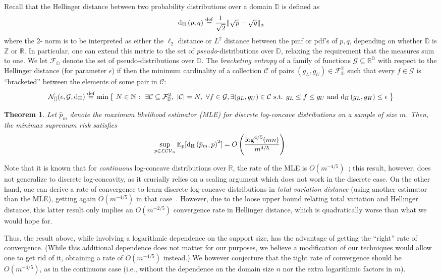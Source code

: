 \documentclass[11pt]{article}
\newcommand{\new}[1]{{\color{red} #1}}
\newcommand{\new}[1]{{#1}}
\newtheorem{theorem}{Theorem}[section]
\theoremstyle{definition}
\newcommand{\R}{\mathbb{R}}
\newcommand{\Z}{\mathbb{Z}}
\newcommand{\N}{\mathbb{N}}
\newcommand{\eps}{\epsilon}
\newcommand{\abs}[1]{\lvert#1\rvert}
\newcommand{\norm}[1]{\lVert#1\rVert}
\newcommand{\eqdef}{\stackrel{{\mathrm {\footnotesize def}}}{=}}
\newcommand{\normtwo}[1]{{\norm{#1}}_2}
\renewcommand{\abs}[1]{\left\lvert #1 \right\rvert}
\newcommand{\setOfSuchThat}[2]{ \left\{\; #1 \;\colon\; #2\; \right\} } 			\newcommand{\clg}[1]{\left\lceil #1 \right\rceil}
\newcommand{\bigO}[1]{{O\left( #1 \right)}}
\newcommand{\tildeO}[1]{\tilde{O}\left( #1 \right)}
\newcommand{\classlogconcave}{\ensuremath{\mathcal{LCV}}\xspace}
\newcommand{\bracketing}[3][\operatorname{d}_{\rm H}]{\mathcal{N}_{[ ]}(#2,#3,#1)}
\newcommand{\hellinger}[2]{{\operatorname{d_{\rm{}H}}\left({#1, #2}\right)}}
\newcommand{\lp}[1][1]{\ell_{#1}}
\newcommand{\class}{\ensuremath{\mathcal{C}}\xspace} \newenvironment{proofof}[1]{\begin{proof}[Proof of {#1}]}{\end{proof}}
\newcommand{\shortexpect}{\mathbb{E}}
\begin{document}
Recall that the Hellinger distance between two probability distributions over a domain $\mathbb{D}$ is defined as 
\[
\hellinger{p}{q} \eqdef \frac{1}{\sqrt{2}}\normtwo{\sqrt{p}-\sqrt{q}}
\]
where the 2- norm is to be interpreted as either the $\lp[2]$ distance or $L^2$ distance between the pmf or pdf's of $p,q$, depending on whether $\mathbb{D}$ is $\Z$ or $\R$. In particular, one can extend this metric to the set of \emph{pseudo}-distributions over $\mathbb{D}$, relaxing the requirement that the measures sum to one. We let $\mathcal{F}_{\mathbb{D}}$ denote the set of pseudo-distributions over $\mathbb{D}$. The \emph{bracketing entropy} of a family of functions $\mathcal{G}\subseteq\R^{\mathbb{D}}$ with respect to the Hellinger distance (for parameter $\eps$) if then the minimum cardinality of a collection $\class$ of pairs $(g_L,g_U)\in \mathcal{F}_{\mathbb{D}}^2$ such that every $f\in\mathcal{G}$ is ``bracketed'' between the elements of some pair in $\class$:
\[
    \bracketing{\eps}{\mathcal{G}} \eqdef \min\setOfSuchThat{ N\in\N }{ \exists \class \subseteq \mathcal{F}_{\mathbb{D}}^2,\ \abs{\class}=N,\ \forall f\in\mathcal{G}, \exists (g_L,g_U)\in\class\text{ s.t. } g_L\leq f\leq g_U \text{ and } \hellinger{g_L}{g_H}\leq \eps }
\]

\begin{theorem}\label{theo:mle:logconcave}
Let $\hat{p}_m$ denote the maximum likelihood estimator (MLE) for discrete log-concave distributions on a sample of size $m$. Then, the minimax supremum risk satisfies
\[
    \sup_{p\in\classlogconcave_n}\shortexpect_p[ \hellinger{\hat{p}_m}{p}^2 ] = \bigO{ \frac{\log^{4/5} (mn)}{m^{4/5}} }.
\]
\end{theorem}

Note that it is known that for \emph{continuous} log-concave distributions over $\R$, the rate of the MLE is $O(m^{-4/5})$~\cite{KS:16}; this result, however, does not generalize to discrete log-concavity, as it crucially relies on a scaling argument which does not work in the discrete case. On the other hand, one can derive a rate of convergence to learn discrete log-concave distributions in \emph{total variation distance} (using another estimator than the MLE), getting again $O(m^{-4/5})$ in that case~\cite{DKS:16:LLCV}. However, due to the loose upper bound relating total variation and Hellinger distance, this latter result only implies an $O(m^{-2/5})$ convergence rate in Hellinger distance, which is quadratically worse than what we would hope for.

Thus, the result above, while involving a logarithmic dependence on the support size, has the advantage of getting the ``right'' rate of convergence. (While this additional dependence does not matter for our purposes, we believe a modification of our techniques would allow one to get rid of it, obtaining a rate of $\tildeO{m^{-4/5}}$ instead.) \new{We however conjecture that the tight rate of convergence should be $O(m^{-4/5})$, as in the continuous case (i.e., without the dependence on the domain size $n$ nor the extra logarithmic factors in $m$).}\medskip
\end{document}
